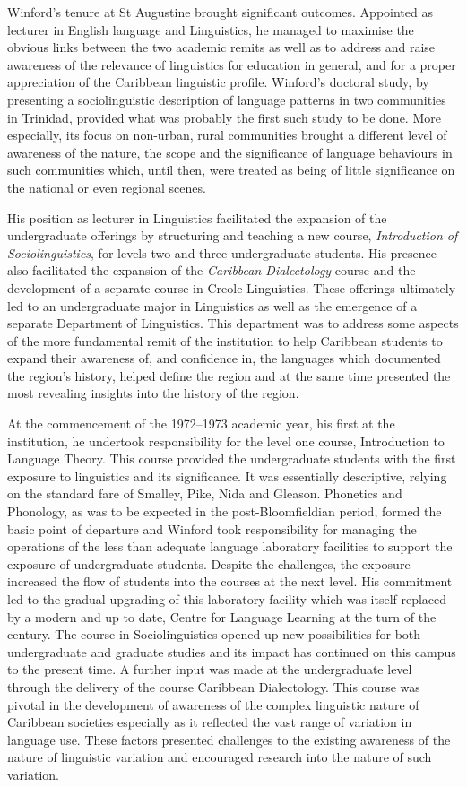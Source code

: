 \documentclass[output=paper, colorlinks,citecolor=brown]{langscibook}
\begin{document}
Winford’s tenure at St Augustine brought significant outcomes. Appointed as lecturer in English language and Linguistics, he managed to maximise the obvious links between the two academic remits as well as to address and raise awareness of the relevance of linguistics for education in general, and for a proper appreciation of the Caribbean linguistic profile. Winford’s doctoral study, by presenting a sociolinguistic description of language patterns in two communities in Trinidad, provided what was probably the first such study to be done. More especially, its focus on non-urban, rural communities brought a different level of awareness of the nature, the scope and the significance of language behaviours in such communities which, until then, were treated as being of little significance on the national or even regional scenes. 
 
His position as lecturer in Linguistics facilitated the expansion of the undergraduate offerings by structuring and teaching a new course, \textit{Introduction of Sociolinguistics}, for levels two and three undergraduate students. His presence also facilitated the expansion of the \textit{Caribbean Dialectology} course and the development of a separate course in Creole Linguistics. These offerings ultimately led to an undergraduate major in Linguistics as well as the emergence of a separate Department of Linguistics. This department was to address some aspects of the more fundamental remit of the institution to help Caribbean students to expand their awareness of, and confidence in, the languages which documented the region’s history, helped define the region and at the same time presented the most revealing insights into the history of the region.


At the commencement of the 1972--1973 academic year, his first at the institution, he undertook responsibility for the level one course, Introduction to Language Theory. This course provided the undergraduate students with the first exposure to linguistics and its significance. It was essentially descriptive, relying on the standard fare of Smalley, Pike, Nida and Gleason. Phonetics and Phonology, as was to be expected in the post-Bloomfieldian period, formed the basic point of departure and Winford took responsibility for managing the operations of the less than adequate language laboratory facilities to support the exposure of undergraduate students. Despite the challenges, the exposure increased the flow of students into the courses at the next level. His commitment led to the gradual upgrading of this laboratory facility which was itself replaced by a modern and up to date, Centre for Language Learning at the turn of the century. The course in Sociolinguistics opened up new possibilities for both undergraduate and graduate studies and its impact has continued on this campus to the present time. A further input was made at the undergraduate level through the delivery of the course Caribbean Dialectology. This course was pivotal in the development of awareness of the complex linguistic nature of Caribbean societies especially as it reflected the vast range of variation in language use. These factors presented challenges to the existing awareness of the nature of linguistic variation and encouraged research into the nature of such variation.
\end{document}
